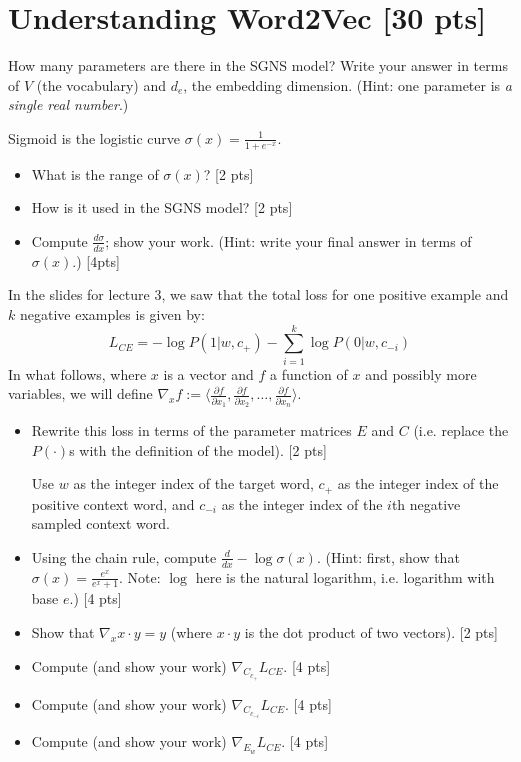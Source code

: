 \documentclass[11pt]{article}
\begin{document}
\section{Understanding Word2Vec [30 pts]}

  How many parameters are there in the SGNS model?  Write your answer in terms of $V$ (the vocabulary) and $d_e$, the embedding dimension.  (Hint: one parameter is \emph{a single real number}.)

\vspace{2em}
  Sigmoid is the logistic curve $\sigma(x) = \frac{1}{1+e^{-x}}$.
\begin{itemize}
  \item What is the range of $\sigma(x)$? [2 pts]
  \item How is it used in the SGNS model? [2 pts]
  \item Compute $\frac{d\sigma}{dx}$; show your work.  (Hint: write your final answer in terms of $\sigma(x)$.) [4pts]
\end{itemize}

\vspace{2em}
  In the slides for lecture 3, we saw that the total loss for one positive example and $k$ negative examples is given by:
$$ L_{CE} = -\log P(1 | w, c_+) - \sum_{i=1}^k \log P(0 | w, c_{-i})$$
In what follows, where $x$ is a vector and $f$ a function of $x$ and possibly more variables, we will define $\nabla_x f := \langle \frac{\partial f}{\partial x_1} , \frac{\partial f}{\partial x_2}, \dots , \frac{\partial f}{\partial x_n} \rangle$.
\begin{itemize}
  \item Rewrite this loss in terms of the parameter matrices $E$ and $C$ (i.e. replace the $P(\cdot)$s with the definition of the model). [2 pts]

        Use $w$ as the integer index of the target word, $c_+$ as the integer index of the positive context word, and $c_{-i}$ as the integer index of the $i$th negative sampled context word.
  \item Using the chain rule, compute $\frac{d}{dx} -\log\sigma(x)$.  (Hint: first, show that $\sigma(x) = \frac{e^x}{e^x+1}$.  Note: $\log$ here is the natural logarithm, i.e. logarithm with base $e$.) [4 pts]
  \item Show that $\nabla_x x \cdot y = y$ (where $x \cdot y$ is the dot product of two vectors). [2 pts]
  \item Compute (and show your work) $\nabla_{C_{c_+}} L_{CE}$. [4 pts]
  \item Compute (and show your work) $\nabla_{C_{c_{-i}}} L_{CE}$. [4 pts]
  \item Compute (and show your work) $\nabla_{E_w} L_{CE}$. [4 pts]
\end{itemize}
\end{document}
